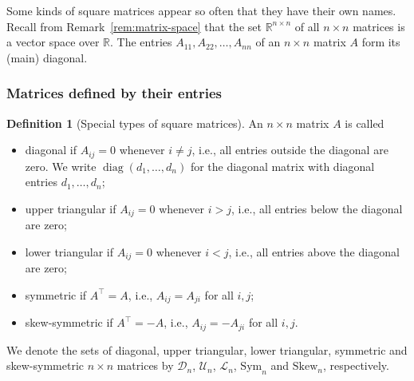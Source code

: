 \documentclass[11pt]{article}
\theoremstyle{definition}
\newtheorem{definition}{Definition}[section]
\theoremstyle{plain}
\theoremstyle{remark}
\DeclareMathOperator{\diag}{diag}
\begin{document}
Some kinds of square matrices appear so often that they have their own names. Recall from Remark~\ref{rem:matrix-space} that the set $\mathbb{R}^{n \times n}$ of all $n \times n$ matrices is a vector space over $\mathbb{R}$. The entries $A_{11}, A_{22}, \ldots, A_{nn}$ of an $n \times n$ matrix $A$ form its (main) diagonal.

\subsubsection{Matrices defined by their entries}

\begin{definition}[Special types of square matrices]
    An $n \times n$ matrix $A$ is called
    \begin{itemize}
        \item diagonal if $A_{ij} = 0$ whenever $i \neq j$, i.e., all entries outside the diagonal are zero. We write $\diag(d_1, \ldots, d_n)$ for the diagonal matrix with diagonal entries $d_1, \ldots, d_n$;
        \item upper triangular if $A_{ij} = 0$ whenever $i > j$, i.e., all entries below the diagonal are zero;
        \item lower triangular if $A_{ij} = 0$ whenever $i < j$, i.e., all entries above the diagonal are zero;
        \item symmetric if $A^\top = A$, i.e., $A_{ij} = A_{ji}$ for all $i, j$;
        \item skew-symmetric if $A^\top = -A$, i.e., $A_{ij} = -A_{ji}$ for all $i, j$.
    \end{itemize}
    We denote the sets of diagonal, upper triangular, lower triangular, symmetric and skew-symmetric $n \times n$ matrices by $\mathcal{D}_n$, $\mathcal{U}_n$, $\mathcal{L}_n$, $\mathrm{Sym}_n$ and $\mathrm{Skew}_n$, respectively.
\end{definition}
\end{document}
